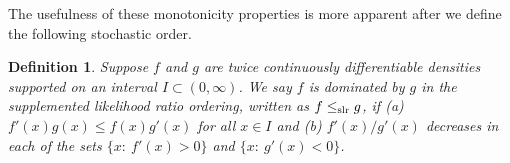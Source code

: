 \documentclass[11pt]{article}
\newtheorem{definition}{\bf Definition}
\begin{document}
The usefulness of these monotonicity properties is more apparent after we define the following stochastic order.

\begin{definition}
Suppose $f$ and $g$ are twice continuously differentiable densities supported on an interval $I\subset (0, \infty)$.  We say $f$ is dominated by $g$ in the {\it supplemented likelihood ratio} ordering, written as $f\leq_{\rm slr} g$, if (a) $f'(x)g(x)\leq f(x)g'(x)$ for all $x\in I$ and (b) $f'(x)/ g'(x)$ decreases in each of the sets $\{x:\ f'(x) >0\}$ and $\{x:\ g'(x) <0\}$.  
\end{definition}
\end{document}
